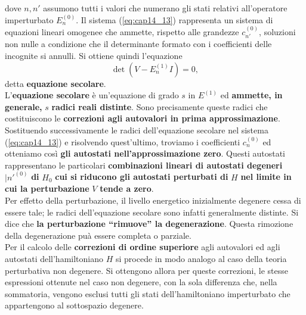 dove $n, n'$ assumono tutti i valori che numerano gli stati relativi all'operatore imperturbato $E_n ^{(0)}$. Il sistema (\ref{eq:cap14_13}) rappresenta un sistema di equazioni lineari omogenee che ammette, rispetto alle grandezze $c_{n'} ^{(0)}$, soluzioni non nulle a condizione che il determinante formato con i coefficienti delle incognite si annulli. Si ottiene quindi l'equazione
\begin{equation}
\det \left( V - E_n ^{(1)} I \right) =0,
\end{equation}
detta \textbf{equazione secolare}.\\
L'\textbf{equazione secolare} è un'equazione di grado $s$ in $E^{(1)}$ ed \textbf{ammette, in generale,} $s$ \textbf{radici reali distinte}. Sono precisamente queste radici che costituiscono le \textbf{correzioni agli autovalori in prima approssimazione}.\\
Sostituendo successivamente le radici dell'equazione secolare nel sistema (\ref{eq:cap14_13}) e risolvendo quest'ultimo, troviamo i coefficienti $c_n ^{(0)}$ ed otteniamo così \textbf{gli autostati nell'approssimazione zero}. Questi autostati rappresentano le particolari \textbf{combinazioni lineari di autostati degeneri} $\vert n'^{(0)}$ \textbf{di} $H_0$ \textbf{cui si riducono gli autostati perturbati di} $H$ \textbf{ nel limite in cui la perturbazione} $V$ \textbf{tende a zero}.\\
Per effetto della perturbazione, il livello energetico inizialmente degenere cessa di essere tale; le radici dell'equazione secolare sono infatti generalmente distinte. Si dice che \textbf{la perturbazione ``rimuove'' la degenerazione}. Questa rimozione della degenerazione puà essere completa o parziale.\\
Per il calcolo delle \textbf{correzioni di ordine superiore} agli autovalori ed agli autostati dell'hamiltoniano $H$ si procede in modo analogo al caso della teoria perturbativa non degenere. Si ottengono allora per queste correzioni, le stesse espressioni ottenute nel caso non degenere, con la sola differenza che, nella sommatoria, vengono esclusi tutti gli stati dell'hamiltoniano imperturbato che appartengono al sottospazio degenere.